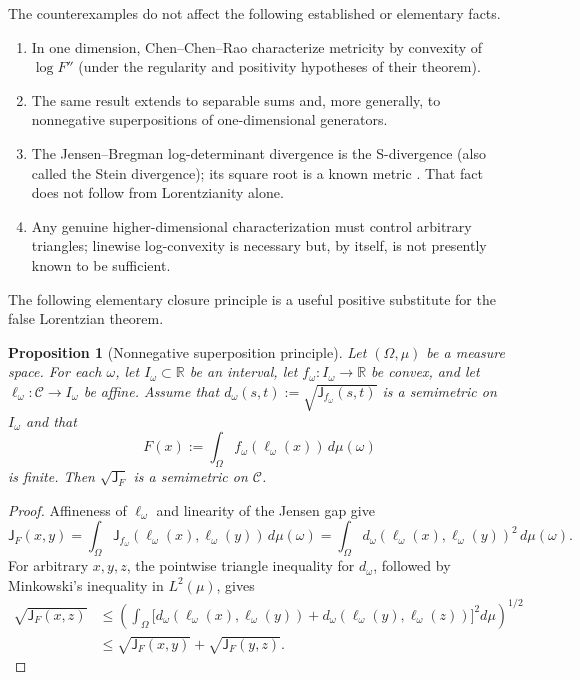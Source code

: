 \documentclass[11pt]{article}
\newtheorem{proposition}[theorem]{Proposition}
\theoremstyle{definition}
\newcommand{\R}{\mathbb{R}}
\newcommand{\C}{\mathcal{C}}
\newcommand{\J}{\mathsf{J}}
\begin{document}
The counterexamples do not affect the following established or elementary facts.

\begin{enumerate}[label=\textup{(\alph*)},leftmargin=2em]
\item In one dimension, Chen--Chen--Rao \cite{ChenChenRao} characterize metricity by
      convexity of $\log F''$ (under the regularity and positivity hypotheses of their theorem).
\item The same result extends to separable sums and, more generally, to nonnegative
      superpositions of one-dimensional generators.
\item The Jensen--Bregman log-determinant divergence is the S-divergence (also called the
      Stein divergence); its square root is a known metric \cite{SraSdiv}.  That fact does not
      follow from Lorentzianity alone.
\item Any genuine higher-dimensional characterization must control arbitrary triangles;
      linewise log-convexity is necessary but, by itself, is not presently known to be sufficient.
\end{enumerate}

The following elementary closure principle is a useful positive substitute for the false
Lorentzian theorem.

\begin{proposition}[Nonnegative superposition principle]\label{prop:superposition}
Let $(\Omega,\mu)$ be a measure space.  For each $\omega$, let $I_\omega\subset\R$ be an
interval, let $f_\omega:I_\omega\to\R$ be convex, and let
$\ell_\omega:\C\to I_\omega$ be affine.  Assume that
$d_\omega(s,t):=\sqrt{\J_{f_\omega}(s,t)}$ is a semimetric on $I_\omega$ and that
\[
 F(x):=\int_\Omega f_\omega(\ell_\omega(x))\,d\mu(\omega)
\]
is finite.  Then $\sqrt{\J_F}$ is a semimetric on $\C$.
\end{proposition}

\begin{proof}
Affineness of $\ell_\omega$ and linearity of the Jensen gap give
\[
 \J_F(x,y)=\int_\Omega
 \J_{f_\omega}(\ell_\omega(x),\ell_\omega(y))\,d\mu(\omega)
 =\int_\Omega d_\omega(\ell_\omega(x),\ell_\omega(y))^2\,d\mu(\omega).
\]
For arbitrary $x,y,z$, the pointwise triangle inequality for $d_\omega$, followed by
Minkowski's inequality in $L^2(\mu)$, gives
\begin{align*}
 \sqrt{\J_F(x,z)}
 &\le\left(\int_\Omega
   \bigl[d_\omega(\ell_\omega(x),\ell_\omega(y))
        +d_\omega(\ell_\omega(y),\ell_\omega(z))\bigr]^2d\mu\right)^{1/2}\\
 &\le \sqrt{\J_F(x,y)}+\sqrt{\J_F(y,z)}.
\end{align*}
\end{proof}
\end{document}
